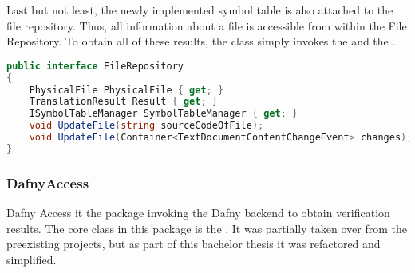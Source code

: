 Last but not least, the newly implemented symbol table is also attached to the file repository. Thus, all information about a file is accessible from within the File Repository. To obtain all of these results, the class simply invokes the  and the .

\begin{lstlisting}[language=csharp, caption={Handling Compilation}, captionpos=b, label={lst:handlecompilation}]
public interface FileRepository
{
    PhysicalFile PhysicalFile { get; }
    TranslationResult Result { get; }
    ISymbolTableManager SymbolTableManager { get; }
    void UpdateFile(string sourceCodeOfFile);
    void UpdateFile(Container<TextDocumentContentChangeEvent> changes);
}
\end{lstlisting}


\subsubsection{DafnyAccess}
Dafny Access it the package invoking the Dafny backend to obtain verification results. The core class in this package is the . It was partially taken over from the preexisting projects, but as part of this bachelor thesis it was refactored and simplified.

